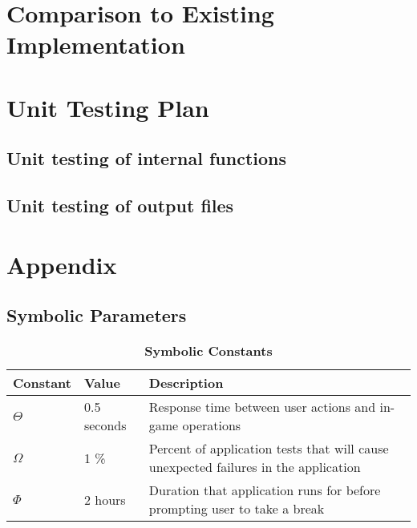 \documentclass[12pt, titlepage]{article}
\begin{document}
\section{Comparison to Existing Implementation}	
				
\section{Unit Testing Plan}
		
\subsection{Unit testing of internal functions}
		
\subsection{Unit testing of output files}		

%

%

\newpage

\section{Appendix}

\subsection{Symbolic Parameters}


\begin{table}[H]
\caption{\bf Symbolic Constants} \label{tab:constants}
\begin{tabularx}{\textwidth}{p{3cm}p{2cm}X}
\toprule {\bf Constant} & {\bf Value} & {\bf Description}\\
\midrule
$\Theta$ & 0.5 seconds & Response time between user actions and in-game operations\\
$\Omega$ & 1 \% & Percent of application tests that will cause unexpected failures in the application\\
$\Phi$ & 2 hours & Duration that application runs for before prompting user to take a break\\
\bottomrule
\end{tabularx}
\end{table}
\end{document}
